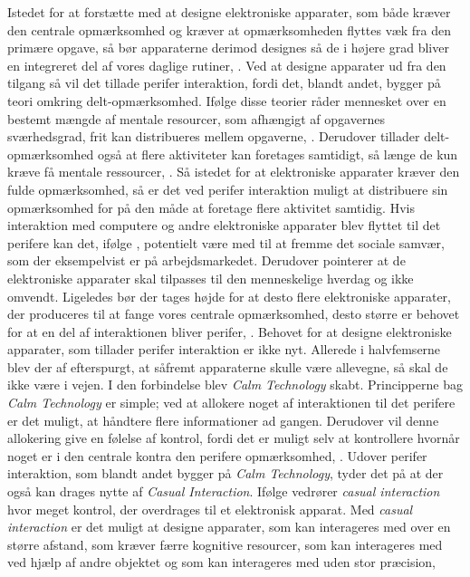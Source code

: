 Istedet for at forstætte med at designe elektroniske apparater, som både kræver den centrale opmærksomhed og kræver at opmærksomheden flyttes væk fra den primære opgave, så bør apparaterne derimod designes så de i højere grad bliver en integreret del af vores daglige rutiner, \parencite[s. 239]{PDF:PICharacteristicsAndConsiderations}. Ved at designe apparater ud fra den tilgang så vil det tillade perifer interaktion, fordi det, blandt andet, bygger på teori omkring delt-opmærksomhed. Ifølge disse teorier råder mennesket over en bestemt mængde af mentale resourcer, som afhængigt af opgavernes sværhedsgrad, frit kan distribueres mellem opgaverne, \parencite[s. 240]{PDF:PICharacteristicsAndConsiderations}. Derudover tillader delt-opmærksomhed også at flere aktiviteter kan foretages samtidigt, så længe de kun kræve få mentale ressourcer, \parencite[s. 2]{PDF:FacilitatingPIDesignAndEvaluation}. Så istedet for at elektroniske apparater kræver den fulde opmærksomhed, så er det ved perifer interaktion muligt at distribuere sin opmærksomhed for på den måde at foretage flere aktivitet samtidig. Hvis interaktion med computere og andre elektroniske apparater blev flyttet til det perifere kan det, ifølge \textcite[s. 11]{PDF:TheComputerWeiser}, potentielt være med til at fremme det sociale samvær, som der eksempelvist er på arbejdsmarkedet. Derudover pointerer \textcite[s. 11]{PDF:TheComputerWeiser} at de elektroniske apparater skal tilpasses til den menneskelige hverdag og ikke omvendt. Ligeledes bør der tages højde for at desto flere elektroniske apparater, der produceres til at fange vores centrale opmærksomhed, desto større er behovet for at en del af interaktionen bliver perifer, \parencite[s. 240]{PDF:PICharacteristicsAndConsiderations}. \blankline
%
Behovet for at designe elektroniske apparater, som tillader perifer interaktion er ikke nyt. Allerede i halvfemserne blev der af \textcite[s. 3]{PDF:TheComingAgeOfCalmTech} efterspurgt, at såfremt apparaterne skulle være allevegne, så skal de ikke være i vejen. I den forbindelse blev \textit{Calm Technology} skabt. Principperne bag \textit{Calm Technology} er simple; ved at allokere noget af interaktionen til det perifere er det muligt, at håndtere flere informationer ad gangen. Derudover vil denne allokering give en følelse af kontrol, fordi det er muligt selv at kontrollere hvornår noget er i den centrale kontra den perifere opmærksomhed, \parencite[s. 4]{PDF:TheComingAgeOfCalmTech}. Udover perifer interaktion, som blandt andet bygger på \textit{Calm Technology}, tyder det på at der også kan drages nytte af \textit{Casual Interaction}. Ifølge \textcite[ss. 118-119]{PDF:PeripheralInteraction} vedrører \textit{casual interaction} hvor meget kontrol, der overdrages til et elektronisk apparat. Med \textit{casual interaction} er det muligt at designe apparater, som kan interageres med over en større afstand, som kræver færre kognitive resourcer, som kan interageres med ved hjælp af andre objektet og som kan interageres med uden stor præcision, \parencite[s. 128]{PDF:PeripheralInteraction}        
